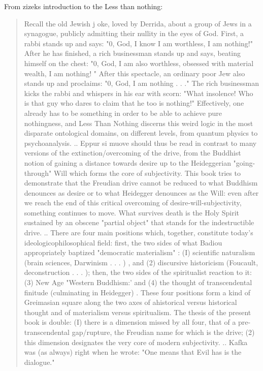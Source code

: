 \documentclass{book}
\begin{document}
From zizeks introduction to the Less than nothing:
\begin{quotation}
Recall the old Jewish j oke, loved by Derrida, about a group of Jews in a synagogue, publicly admitting their nullity in the eyes of God. First, a rabbi stands up and says: "0, God, I know I am worthless, I am nothing!" After he has finished, a rich businessman stands up and says, beating himself on the chest: "0, God, I am also worthless, obsessed with material wealth, I am nothing! " After this spectacle, an ordinary poor Jew also stands up and proclaims: "0, God, I am nothing . . ." The rich businessman kicks the rabbi and whispers in his ear with scorn: "What insolence! Who is that guy who dares to claim that he too is nothing!" Effectively, one already has to be something in order to be able to achieve pure nothingness, and Less Than Nothing discerns this weird logic in the most disparate ontological domains, on different levels, from quantum physics to psychoanalysis.
..
Eppur si muove should thus be read in contrast to many versions of the extinction/overcoming of the drive, from the Buddhist notion of gaining a distance towards desire up to the Heideggerian "going-through" Will which forms the core of subjectivity. This book tries to demonstrate that the Freudian drive cannot be reduced to what Buddhism denounces as desire or to what Heidegger denounces as the Will: even after we reach the end of this critical overcoming of desire-will-subjectivity, something continues to move. What survives death is the Holy Spirit sustained by an obscene "partial object" that stands for the indestructible drive.
..
There are four main positions which, together, constitute today's ideologico­philosophical field: first, the two sides of what Badiou appropriately baptized "democratic materialism" : (I) scientific naturalism (brain sciences, Darwinism . . . ) , and (2) discursive historicism (Foucault, deconstruction . . . ); then, the two sides of the spiritualist reaction to it: (3) New Age "Western Buddhism:' and (4) the thought of transcendental finitude (culminating in Heidegger) . These four positions form a kind of Greimasian square along the two axes of ahistorical versus historical thought and of materialism versus spiritualism. The thesis of the present book is double: (I) there is a dimension missed by all four, that of a pre-transcendental gap/rupture, the Freudian name for which is the drive; (2) this dimension designates the very core of modern subjectivity.
..
Kafka was (as always) right when he wrote: "One means that Evil has is the dialogue."

\end{quotation}
\end{document}

